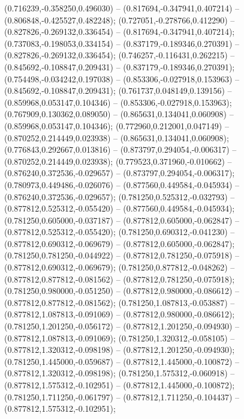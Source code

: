  (0.716239,-0.358250,0.496030) -- (0.817694,-0.347941,0.407214) -- (0.806848,-0.425527,0.482248);
 (0.727051,-0.278766,0.412290) -- (0.827826,-0.269132,0.336454) -- (0.817694,-0.347941,0.407214);
 (0.737083,-0.198053,0.334154) -- (0.837179,-0.189346,0.270391) -- (0.827826,-0.269132,0.336454);
 (0.746257,-0.116431,0.262215) -- (0.845692,-0.108847,0.209431) -- (0.837179,-0.189346,0.270391);
 (0.754498,-0.034242,0.197038) -- (0.853306,-0.027918,0.153963) -- (0.845692,-0.108847,0.209431);
 (0.761737,0.048149,0.139156) -- (0.859968,0.053147,0.104346) -- (0.853306,-0.027918,0.153963);
 (0.767909,0.130362,0.089050) -- (0.865631,0.134041,0.060908) -- (0.859968,0.053147,0.104346);
 (0.772960,0.212001,0.047149) -- (0.870252,0.214449,0.023938) -- (0.865631,0.134041,0.060908);
 (0.776843,0.292667,0.013816) -- (0.873797,0.294054,-0.006317) -- (0.870252,0.214449,0.023938);
 (0.779523,0.371960,-0.010662) -- (0.876240,0.372536,-0.029657) -- (0.873797,0.294054,-0.006317);
 (0.780973,0.449486,-0.026076) -- (0.877560,0.449584,-0.045934) -- (0.876240,0.372536,-0.029657);
 (0.781250,0.525312,-0.032793) -- (0.877812,0.525312,-0.055420) -- (0.877560,0.449584,-0.045934);
 (0.781250,0.605000,-0.037187) -- (0.877812,0.605000,-0.062847) -- (0.877812,0.525312,-0.055420);
 (0.781250,0.690312,-0.041230) -- (0.877812,0.690312,-0.069679) -- (0.877812,0.605000,-0.062847);
 (0.781250,0.781250,-0.044922) -- (0.877812,0.781250,-0.075918) -- (0.877812,0.690312,-0.069679);
 (0.781250,0.877812,-0.048262) -- (0.877812,0.877812,-0.081562) -- (0.877812,0.781250,-0.075918);
 (0.781250,0.980000,-0.051250) -- (0.877812,0.980000,-0.086612) -- (0.877812,0.877812,-0.081562);
 (0.781250,1.087813,-0.053887) -- (0.877812,1.087813,-0.091069) -- (0.877812,0.980000,-0.086612);
 (0.781250,1.201250,-0.056172) -- (0.877812,1.201250,-0.094930) -- (0.877812,1.087813,-0.091069);
 (0.781250,1.320312,-0.058105) -- (0.877812,1.320312,-0.098198) -- (0.877812,1.201250,-0.094930);
 (0.781250,1.445000,-0.059687) -- (0.877812,1.445000,-0.100872) -- (0.877812,1.320312,-0.098198);
 (0.781250,1.575312,-0.060918) -- (0.877812,1.575312,-0.102951) -- (0.877812,1.445000,-0.100872);
 (0.781250,1.711250,-0.061797) -- (0.877812,1.711250,-0.104437) -- (0.877812,1.575312,-0.102951);
